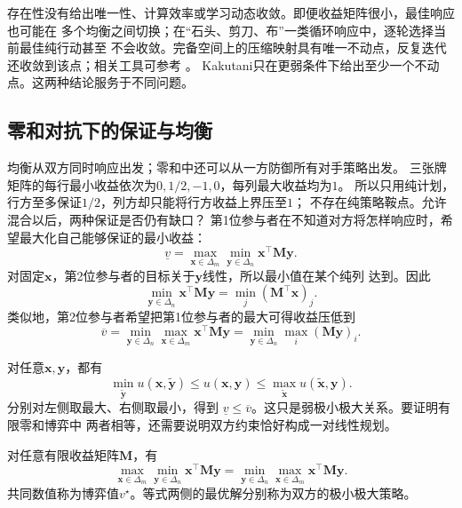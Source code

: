 存在性没有给出唯一性、计算效率或学习动态收敛。即便收益矩阵很小，最佳响应也可能在
多个均衡之间切换；在“石头、剪刀、布”一类循环响应中，逐轮选择当前最佳纯行动甚至
不会收敛。完备空间上的压缩映射具有唯一不动点，反复迭代还收敛到该点；相关工具可参考
。
Kakutani只在更弱条件下给出至少一个不动点。这两种结论服务于不同问题。

\subsection{零和对抗下的保证与均衡}
\label{sec:game-matrix-zero-sum-duality}

均衡从双方同时响应出发；零和中还可以从一方防御所有对手策略出发。
三张牌矩阵的每行最小收益依次为\(0,1/2,-1,0\)，每列最大收益均为\(1\)。
所以只用纯计划，行方至多保证\(1/2\)，列方却只能将行方收益上界压至\(1\)；
不存在纯策略鞍点。允许混合以后，两种保证是否仍有缺口？
第1位参与者在不知道对方将怎样响应时，希望最大化自己能够保证的最小收益：
\[
  \underline v
  =
  \max_{\bm{x}\in\Delta_m}
  \min_{\bm{y}\in\Delta_n}
  \bm{x}^{\top}\bm{M}\bm{y}.
\]
对固定\(\bm{x}\)，第2位参与者的目标关于\(\bm{y}\)线性，所以最小值在某个纯列
达到。因此
\[
  \min_{\bm{y}\in\Delta_n}
  \bm{x}^{\top}\bm{M}\bm{y}
  =
  \min_j(\bm{M}^{\top}\bm{x})_j.
\]
类似地，第2位参与者希望把第1位参与者的最大可得收益压低到
\[
  \overline v
  =
  \min_{\bm{y}\in\Delta_n}
  \max_{\bm{x}\in\Delta_m}
  \bm{x}^{\top}\bm{M}\bm{y}
  =
  \min_{\bm{y}\in\Delta_n}\max_i(\bm{M}\bm{y})_i.
\]

对任意\(\bm{x},\bm{y}\)，都有
\[
  \min_{\widetilde{\bm{y}}}
  u(\bm{x},\widetilde{\bm{y}})
  \leq
  u(\bm{x},\bm{y})
  \leq
  \max_{\widetilde{\bm{x}}}
  u(\widetilde{\bm{x}},\bm{y}).
\]
分别对左侧取最大、右侧取最小，得到
\(\underline v\leq\overline v\)。这只是弱极小极大关系。要证明有限零和博弈中
两者相等，还需要说明双方约束恰好构成一对线性规划。

\begin{theorem}[有限零和博弈的极小极大定理]
\label{thm:game-finite-minimax}
对任意有限收益矩阵\(\bm{M}\)，有
\begin{equation}
  \max_{\bm{x}\in\Delta_m}
  \min_{\bm{y}\in\Delta_n}
  \bm{x}^{\top}\bm{M}\bm{y}
  =
  \min_{\bm{y}\in\Delta_n}
  \max_{\bm{x}\in\Delta_m}
  \bm{x}^{\top}\bm{M}\bm{y}.
  \label{eq:game-minimax-equality}
\end{equation}
共同数值称为博弈值\(v^\star\)。等式两侧的最优解分别称为双方的极小极大策略。
\end{theorem}

